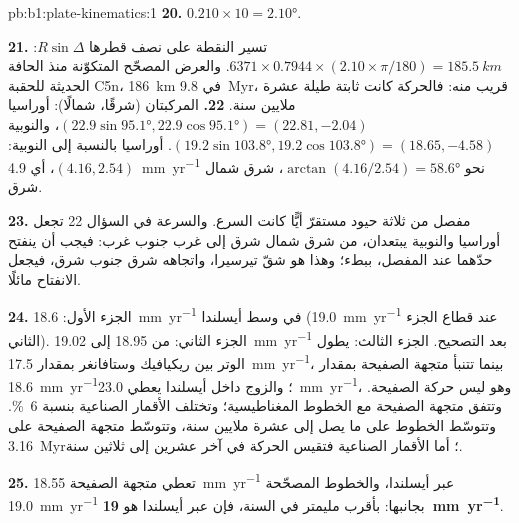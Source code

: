 \begin{solution}{pb:b1:plate-kinematics:1}
\textbf{20.} $0.210\times10 = \ang{2.10}$.

\textbf{21.} تسير النقطة على  نصف قطرها $R\sin\Delta$:
$6371\times0.7944\times(2.10\times\pi/180) = \qty{185.5}{km}$. والعرض المصحّح  المتكوّنة منذ الحافة الحديثة للحقبة C5n، \qty{186}{km} في \qty{9.8}{Myr}، قريب منه: فالحركة كانت ثابتة طيلة عشرة ملايين سنة.
\textbf{22.} المركبتان (شرقًا، شمالًا): أوراسيا
$(22.9\sin\ang{95.1}, 22.9\cos\ang{95.1}) = (22.81, -2.04)$، والنوبية
$(19.2\sin\ang{103.8}, 19.2\cos\ang{103.8}) = (18.65, -4.58)$. أوراسيا بالنسبة
إلى النوبية: $(4.16, 2.54)$، أي \qty{4.9}{mm.yr^{-1}} نحو
$\arctan(4.16/2.54) = \ang{58.6}$، شرق شمال شرق.

\textbf{23.} مفصل من ثلاثة حيود مستقرّ أيًّا كانت السرع. والسرعة في السؤال 22 تجعل أوراسيا والنوبية يبتعدان، من شرق شمال شرق إلى غرب جنوب غرب: فيجب أن ينفتح حدّهما عند المفصل، ببطء؛ وهذا هو شقّ تيرسيرا، واتجاهه شرق جنوب شرق، فيجعل الانفتاح مائلًا.

\textbf{24.} الجزء الأول: \qty{18.6}{mm.yr^{-1}} في وسط أيسلندا (\qty{19.0}{mm.yr^{-1}} عند قطاع الجزء الثاني). الجزء الثاني: من 18.95 إلى \qty{19.02}{mm.yr^{-1}} بعد التصحيح. الجزء الثالث: يطول الوتر بين ريكيافيك وستافانغر بمقدار \qty{17.5}{mm.yr^{-1}}، بينما تتنبأ متجهة الصفيحة بمقدار \qty{18.6}{mm.yr^{-1}}؛ والزوج داخل أيسلندا يعطي \qty{23.0}{mm.yr^{-1}}، وهو ليس حركة الصفيحة. وتتفق متجهة الصفيحة مع الخطوط المغناطيسية؛ وتختلف الأقمار الصناعية بنسبة \qty{6}{\percent}. وتتوسّط الخطوط على ما يصل إلى عشرة ملايين سنة، وتتوسّط متجهة الصفيحة على \qty{3.16}{Myr}؛ أما الأقمار الصناعية فتقيس الحركة في آخر عشرين إلى ثلاثين سنة.

\textbf{25.} تعطي متجهة الصفيحة \qty{18.55}{mm.yr^{-1}} عبر أيسلندا، والخطوط المصحّحة \qty{19.0}{mm.yr^{-1}} بجانبها: بأقرب مليمتر في السنة، فإن  عبر أيسلندا هو
\textbf{\qty[text-series-to-math=true]{19}{mm.yr^{-1}}}.
\end{solution}
